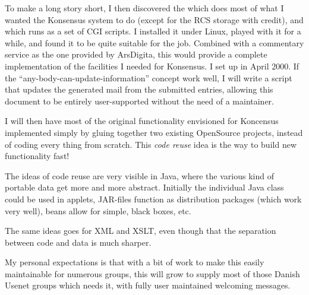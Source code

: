 
To make a long story short, I then discovered the
which does most of what I wanted the Konsensus system to do (except
for the RCS storage with credit), and which runs as a set of CGI
scripts.  I installed it under Linux, played with it for a while, and
found it to be quite suitable for the job.  Combined with a commentary
service as the one provided by ArsDigita, this would provide a
complete implementation of the facilities I needed for Konsensus.  I
set up  in April 2000.  If the
``any-body-can-update-information'' concept work well, I will write a
script that updates the generated mail from the submitted entries,
allowing this document to be entirely user-supported without the need
of a maintainer.

I will then have most of the original functionality envisioned for
Koncensus implemented simply by gluing together two existing
OpenSource projects, instead of coding every thing from scratch.  This
\textit{code reuse} idea is the way to build new functionality fast!

  The ideas of code reuse are very visible in Java, where the various
  kind of portable data get more and more abstract.  Initially the
  individual Java class could be used in applets, JAR-files function
  as distribution packages (which work very well), beans allow for
  simple, black boxes, etc.

  The same ideas goes for XML and XSLT, even though that the
  separation between code and data is much sharper.



My personal expectations is that with a bit of work to make this
easily maintainable for numerous groups, this will grow to supply most
of those Danish Usenet groups which needs it, with fully user
maintained welcoming messages.

